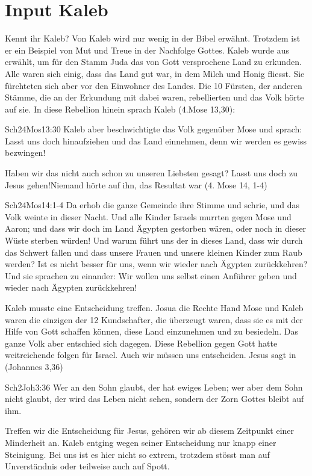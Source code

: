 \documentclass{../inc/mybib}
\begin{document}
\section{Input Kaleb}
Kennt ihr Kaleb?
Von Kaleb wird nur wenig in der Bibel erwähnt. Trotzdem ist er ein Beispiel von Mut und Treue in der Nachfolge Gottes. Kaleb wurde aus erwählt, um für den Stamm Juda das von Gott versprochene Land zu erkunden. Alle waren sich einig, dass das Land gut war, in dem Milch und Honig fliesst. Sie fürchteten sich aber vor den Einwohner des Landes. Die 10 Fürsten, der anderen Stämme, die an der Erkundung mit dabei waren, rebellierten und das Volk hörte auf sie. In diese Rebellion hinein sprach Kaleb (4.Mose 13,30):
\begin{bibeltext}{Sch2}{4Mos}{13:30}
Kaleb aber beschwichtigte das Volk gegenüber Mose und sprach: \glqq{}Lasst uns doch hinaufziehen und das Land einnehmen, denn wir werden es gewiss bezwingen!\grqq
\end{bibeltext}
Haben wir das nicht auch schon zu unseren Liebsten gesagt? \glqq{}Lasst uns doch zu Jesus gehen!\grqq Niemand hörte auf ihn, das Resultat war (4. Mose 14, 1-4)
\begin{bibeltext}{Sch2}{4Mos}{14:1-4}
Da erhob die ganze Gemeinde ihre Stimme und schrie, und das Volk weinte in dieser Nacht. Und alle Kinder Israels murrten gegen Mose und Aaron; und dass wir doch im Land Ägypten gestorben wären, oder noch in dieser Wüste sterben würden! Und warum führt uns der \herr{} in dieses Land, dass wir durch das Schwert fallen und dass unsere Frauen und unsere kleinen Kinder zum Raub werden? Ist es nicht besser für uns, wenn wir wieder nach Ägypten zurückkehren? Und sie sprachen zu einander: \glqq{}Wir wollen uns selbst einen Anführer geben und wieder nach Ägypten zurückkehren!\grqq
\end{bibeltext}
Kaleb musste eine Entscheidung treffen. Josua die Rechte Hand Mose und Kaleb waren die einzigen der 12 Kundschafter, die überzeugt waren, dass sie es mit der Hilfe von Gott schaffen können, diese Land einzunehmen und zu besiedeln. Das ganze Volk aber entschied sich dagegen. Diese Rebellion gegen Gott hatte weitreichende folgen für Israel.
Auch wir müssen uns entscheiden. Jesus sagt in (Johannes 3,36)
\begin{bibeltext}{Sch2}{Joh}{3:36}
Wer an den Sohn glaubt, der hat ewiges Leben; wer aber dem Sohn nicht glaubt, der wird das Leben nicht sehen, sondern der Zorn Gottes bleibt auf ihm.
\end{bibeltext}
Treffen wir die Entscheidung für Jesus, gehören wir ab diesem Zeitpunkt einer Minderheit an. Kaleb entging wegen seiner Entscheidung nur knapp einer Steinigung. Bei uns ist es hier nicht so extrem, trotzdem stösst man auf Unverständnis oder teilweise auch auf Spott.
\end{document}
